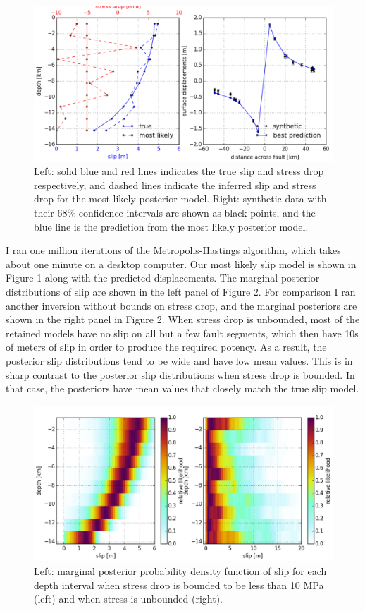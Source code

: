 \documentclass[12pt]{article}
\begin{document}
\begin{figure}
\includegraphics[width=1.0\textwidth]{figure_1}
\caption{Left: solid blue and red lines indicates the true slip and stress drop respectively, and dashed lines indicate the inferred slip and stress drop for the most likely posterior model.  Right: synthetic data with their 68\% confidence intervals are shown as black points, and the blue line is the prediction from the most likely posterior model.}  
\end{figure}

I ran one million iterations of the Metropolis-Hastings algorithm, which takes about one minute on a desktop computer.  Our most likely slip model is shown in Figure 1 along with the predicted displacements.  The marginal posterior distributions of slip are shown in the left panel of Figure 2.  For comparison I ran another inversion without bounds on stress drop, and the marginal posteriors are shown in the right panel in Figure 2.  When stress drop is unbounded, most of the retained models have no slip on all but a few fault segments, which then have 10s of meters of slip in order to produce the required potency.  As a result, the posterior slip distributions tend to be wide and have low mean values.  This is in sharp contrast to the posterior slip distributions when stress drop is bounded.  In that case, the posteriors have mean values that closely match the true slip model.   

\begin{figure}
\includegraphics[width=1.0\textwidth]{figure_2}
\raggedleft
\caption{Left: marginal posterior probability density function of slip for each depth interval when stress drop is bounded to be less than 10 MPa (left) and when stress is unbounded (right).}  
\end{figure}
\end{document}
